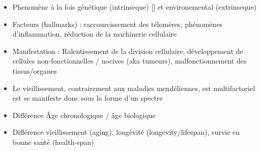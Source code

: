 



\begin{itemize}
    \item Phenomène à la fois génétique (intrinseque) [] et environemental (extrinseque) 
    \item Facteurs (hallmarks) : raccourcissement des télomères, phénomènes d'inflammation, réduction de la machinerie cellulaire
    \item Manifestation : Ralentissement de la division cellulaire, développement de cellules non-fonctionnelles / nocives (aka tumeurs), malfonctionnement des tissus/organes
    \item Le vieillissement, contrairement aux maladies mendéliennes, est multifactoriel est se manifeste donc sous la forme d'un spectre
    \item Différence Âge chronologique / âge biologique
    \item Différence vieillissement (aging), longévité (longevity/lifespan), survie en bonne santé (health-span) 
\end{itemize}

